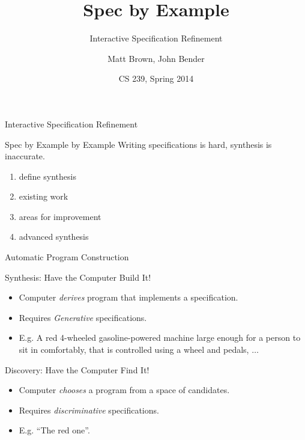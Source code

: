 \documentclass{beamer}
\title{Spec by Example}
\subtitle{Interactive Specification Refinement}
\author{Matt Brown, John Bender}
\date{CS 239, Spring 2014}
\begin{document}
\setlength{\abovedisplayskip}{0pt}
\setlength{\belowdisplayskip}{0pt}
\setlength{\abovedisplayshortskip}{0pt}
\setlength{\belowdisplayshortskip}{0pt}

\begin{frame}
  \titlepage
\end{frame}

\begin{frame}{Interactive Specification Refinement}
  \begin{block}{Spec by Example by Example}
    Writing specifications is hard, synthesis is inaccurate.

    \begin{enumerate}
      \item define synthesis
      \item existing work
      \item areas for improvement
      \item advanced synthesis
    \end{enumerate}
  \end{block}
\end{frame}

\begin{frame}{Automatic Program Construction}
  \begin{block}{Synthesis: Have the Computer Build It!}
    \begin{itemize}
    \item{Computer {\em derives} program that implements a
        specification.}
    \item{Requires {\em Generative} specifications.}
    \item{E.g. A red 4-wheeled gasoline-powered machine large enough
        for a person to sit in comfortably, that is controlled using a
        wheel and pedals, $\dots$}
    \end{itemize}
  \end{block}

  \begin{block}{Discovery: Have the Computer Find It!}
    \begin{itemize}
    \item{Computer {\em chooses} a program from a space of candidates.}
    \item{Requires {\em discriminative} specifications.}
    \item{E.g. ``The red one''.}
    \end{itemize}
  \end{block}
\end{frame}
\end{document}
